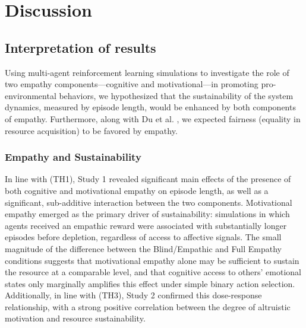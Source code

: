 \section{Discussion}
\subsection{Interpretation of results}

Using multi-agent reinforcement learning simulations to investigate the role of two empathy components---cognitive and motivational---in promoting pro-environmental behaviors, we hypothesized that the sustainability of the system dynamics, measured by episode length, would be enhanced by both components of empathy. Furthermore, along with Du et al. \cite{du_2024}, we expected fairness (equality in resource acquisition) to be favored by empathy.

\subsubsection{Empathy and Sustainability}
In line with (TH1), Study 1 revealed significant main effects of the presence of both cognitive and motivational empathy on episode length, as well as a significant, sub-additive interaction between the two components. Motivational empathy emerged as the primary driver of sustainability: simulations in which agents received an empathic reward were associated with substantially longer episodes before depletion, regardless of access to affective signals. The small magnitude of the difference between the Blind/Empathic and Full Empathy conditions suggests that motivational empathy alone may be sufficient to sustain the resource at a comparable level, and that cognitive access to others' emotional states only marginally amplifies this effect under simple binary action selection. Additionally, in line with (TH3), Study 2 confirmed this dose-response relationship, with a strong positive correlation between the degree of altruistic motivation and resource sustainability.

